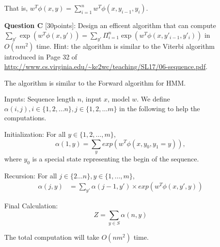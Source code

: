 \begin{itemize}
That is, $w^T \phi(x,y) = \sum_{i=1}^{n} w^T\phi(x,y_{i-1}, y_i)$.

\item[{\bf Question C}][30points]: Design an efficent algorithm that can compute $\sum_{y'} \exp(w^T\phi(x,y')) = \sum_{y'} \Pi_{i=1}^{n} \exp(w^T \phi(x, y'_{i-1}, y'_i))$ in $O(nm^2)$ time. Hint: the algorithm is similar to the Viterbi algorithm introduced in Page 32 of \url{http://www.cs.virginia.edu/~kc2wc/teaching/SL17/06-sequence.pdf}.

{\color{blue}
The algorithm is similar to the Forward algorithm for HMM.

Inputs: Sequence length $n$, input $x$, model $w$. We define $\alpha(i,j), i\in \{1,2,\ldots n\}, j\in \{1, 2, \ldots m\}$ in the following to help the computations. 

Initialization: For all $y \in \{1,2,\ldots, m\}$,
\begin{equation*}
\alpha(1, y) = \sum_{y} exp(w^T \phi(x, y_0, y_1 = y)),
\end{equation*}
where $y_0$ is a special state representing the begin of the sequence. 

Recursion: For all $j \in \{2 \ldots n\}, y \in \{1,\ldots, m\}$,
\begin{equation*}
\begin{split}
\alpha(j, y)
& = \sum_{y' } \alpha(j - 1, y') \times exp(w^T \phi(x, y', y))
\end{split}
\end{equation*}

Final Calculation:
\begin{equation*}
Z = \sum_{y \in S} \alpha(n, y)
\end{equation*}

The total computation will take $O(nm^2)$ time.
}

\end{itemize}
